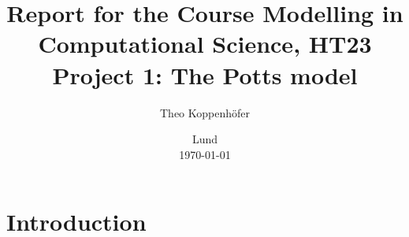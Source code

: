 




\title{ Report for the Course Modelling in Computational Science, HT23 \\[1ex]
	  \large Project 1: The Potts model}
\author{Theo Koppenhöfer}
\date{Lund \\[1ex] \today}







\maketitle

\section{Introduction}






